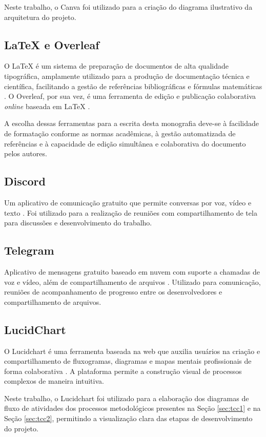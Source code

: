 Neste trabalho, o Canva foi utilizado para a criação do diagrama ilustrativo da arquitetura do projeto.

\subsection[LaTeX e Overleaf]{LaTeX e Overleaf}

O LaTeX é um sistema de preparação de documentos de alta qualidade tipográfica, amplamente utilizado para a produção de documentação técnica e científica, facilitando a gestão de referências bibliográficas e fórmulas matemáticas \cite{latex2026}. O Overleaf, por sua vez, é uma ferramenta de edição e publicação colaborativa \textit{online} baseada em LaTeX \cite{overleaf2026}.

A escolha dessas ferramentas para a escrita desta monografia deve-se à facilidade de formatação conforme as normas acadêmicas, à gestão automatizada de referências e à capacidade de edição simultânea e colaborativa do documento pelos autores.

\subsection[Discord]{Discord}
Um aplicativo de comunicação gratuito que permite conversas por voz, vídeo e texto \cite{pearson2025discord}. Foi utilizado para a realização de reuniões com compartilhamento de tela para discussões e desenvolvimento do trabalho.

\subsection[Telegram]{Telegram}
Aplicativo de mensagens gratuito baseado em nuvem com suporte a chamadas de voz e vídeo, além de compartilhamento de arquivos \cite{telegram2025}. Utilizado para comunicação, reuniões de acompanhamento de progresso entre os desenvolvedores e compartilhamento de arquivos.

\subsection[LucidChart]{LucidChart}
O Lucidchart é uma ferramenta baseada na web que auxilia usuários na criação e compartilhamento de fluxogramas, diagramas e mapas mentais profissionais de forma colaborativa \cite{lucidchart}. A plataforma permite a construção visual de processos complexos de maneira intuitiva.

Neste trabalho, o Lucidchart foi utilizado para a elaboração dos diagramas de fluxo de atividades dos processos metodológicos presentes na Seção \ref{sec:tcc1} e na Seção \ref{sec:tcc2}, permitindo a visualização clara das etapas de desenvolvimento do projeto.

